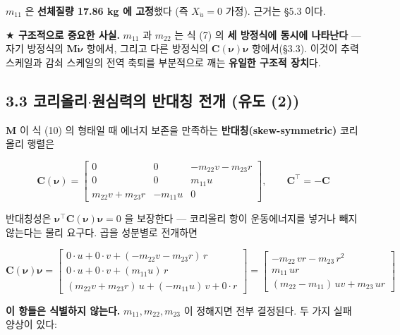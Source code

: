 \documentclass[10pt,a4paper]{article}
\begin{document}
$m_{11}$ 은 \textbf{선체질량 17.86 kg 에 고정}했다 (즉 $X_{\dot u} = 0$ 가정). 근거는 \S{}5.3 이다.

\textbf{$\bigstar$ 구조적으로 중요한 사실.} $m_{11}$ 과 $m_{22}$ 는 식 (7) 의 \textbf{세 방정식에 동시에 나타난다} --- 자기 방정식의 $\mathbf{M}\dot{\boldsymbol{\nu}}$ 항에서, 그리고 다른 방정식의 $\mathbf{C}(\boldsymbol{\nu})\boldsymbol{\nu}$ 항에서(\S{}3.3). 이것이 추력 스케일과 감쇠 스케일의 전역 축퇴를 부분적으로 깨는 \textbf{유일한 구조적 장치}다.

\subsection*{3.3 코리올리$\cdot$원심력의 반대칭 전개 (유도 (2))}

$\mathbf{M}$ 이 식 (10) 의 형태일 때 에너지 보존을 만족하는 \textbf{반대칭(skew-symmetric)} 코리올리 행렬은

\begin{equation*}
\mathbf{C}(\boldsymbol{\nu}) = \begin{bmatrix}
0 & 0 & -m_{22}v - m_{23}r \\
0 & 0 & m_{11}u \\
m_{22}v + m_{23}r & -m_{11}u & 0
\end{bmatrix},
\qquad \mathbf{C}^{\!\top} = -\mathbf{C} \tag{11}
\end{equation*}

반대칭성은 $\boldsymbol{\nu}^\top\mathbf{C}(\boldsymbol{\nu})\boldsymbol{\nu} = 0$ 을 보장한다 --- 코리올리 항이 운동에너지를 넣거나 빼지 않는다는 물리 요구다. 곱을 성분별로 전개하면

\begin{equation*}
\mathbf{C}(\boldsymbol{\nu})\boldsymbol{\nu} =
\begin{bmatrix}
0\cdot u + 0\cdot v + (-m_{22}v - m_{23}r)\,r \\
0\cdot u + 0\cdot v + (m_{11}u)\,r \\
(m_{22}v + m_{23}r)\,u + (-m_{11}u)\,v + 0\cdot r
\end{bmatrix}
=
\begin{bmatrix}
-m_{22}\,v r - m_{23}\,r^2 \\
m_{11}\,u r \\
(m_{22} - m_{11})\,u v + m_{23}\,u r
\end{bmatrix} \tag{12}
\end{equation*}

\textbf{이 항들은 식별하지 않는다.} $m_{11}, m_{22}, m_{23}$ 이 정해지면 전부 결정된다. 두 가지 실패 양상이 있다:
\end{document}
